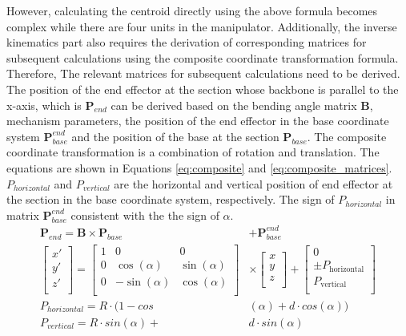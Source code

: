 However, calculating the centroid directly using the above formula becomes complex while there are four units in the manipulator. 
Additionally, the inverse kinematics part also requires the derivation of corresponding matrices for subsequent calculations 
using the composite coordinate transformation formula. Therefore, The relevant matrices for subsequent calculations need to 
be derived. 
The position of the end effector at the section whose backbone is parallel to the x-axis, which is $\textbf{P}_{end}$ can be 
derived based on the bending angle matrix $\textbf{B}$, mechanism parameters, the position of the end effector in the base 
coordinate system $\textbf{P}_{base}^{end}$ and the position of the base at the section $\textbf{P}_{base}$. The composite 
coordinate transformation is a combination of rotation and translation. The equations are shown in Equations \ref{eq:composite} 
and \ref{eq:composite_matrices}. $P_{horizontal}$ and $P_{vertical}$ are the horizontal and vertical position of end effector 
at the section in the base coordinate system, respectively. The sign of $P_{horizontal}$ in matrix $\textbf{P}_{base}^{end}$ 
consistent with the the sign of $\alpha$.
\begin{align}
    \textbf{P}_{end} = \textbf{B} \times \textbf{P}_{base} &+ \textbf{P}_{base}^{end} \label{eq:composite} \\
    \begin{bmatrix}
        x' \\
        y' \\
        z' \\
    \end{bmatrix}
    =
    \begin{bmatrix}
        1 & 0 & 0 \\
        0 & \cos(\alpha) & \sin(\alpha) \\
        0 & -\sin(\alpha) & \cos(\alpha) \\
    \end{bmatrix}
    &\times
    \begin{bmatrix}
        x \\
        y \\
        z \\
    \end{bmatrix}
    +
    \begin{bmatrix}
        0 \\
        \pm P_{\text{horizontal}} \\
        P_{\text{vertical}} \\
    \end{bmatrix}\label{eq:composite_matrices} \\
    P_{horizontal} = R\cdot(1-cos&(\alpha) + d\cdot cos(\alpha)) \nonumber \\ 
    P_{vertical} = R\cdot sin(\alpha) + &d\cdot sin(\alpha) \nonumber
\end{align}
